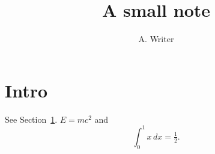 \documentclass{article}
\title{A small note}\author{A. Writer}
\begin{document}
\maketitle
\section{Intro}\label{s:i} See Section~\ref{s:i}. $E=mc^2$ and \begin{equation}\int_0^1 x\,dx=\tfrac12.\end{equation}
\end{document}
